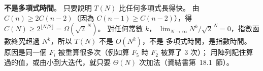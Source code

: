 \begin{pastsoln}
\textbf{不是多項式時間}。 只要說明 $T(N)$ 比任何多項式長得快。 由 $C(n) \ge 2C(n-2)$（因為
$C(n-1) \ge C(n-2)$），得 $C(N) \ge 2^{\lfloor N/2 \rfloor} = \Omega(\sqrt{2}^{\,N})$。 對任何常數 $k$，
$\lim_{N \to \infty} N^k / \sqrt{2}^{\,N} = 0$，指數函數終究超過 $N^k$，所以 $T(N)$ 不是 $O(N^k)$，不是
多項式時間，是指數時間。 原因是同一個 $F_i$ 被重算很多次（例如算 $F_5$ 時 $F_2$ 被算了 $3$ 次）；
用陣列記住算過的值，或由小到大迭代，就只要 $\Theta(N)$ 次加法（資結書第~18.1~節）。
\end{pastsoln}
